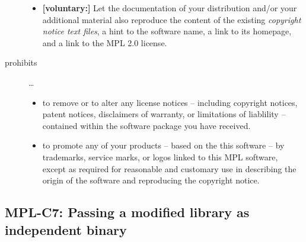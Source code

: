 \begin{description}
\begin{itemize}
  \item \textbf{[voluntary:]} Let the documentation of your distribution and/or
  your additional material  also reproduce the content of the existing
  \emph{copyright notice text files}, a hint to the software name, a link to its
  homepage, and a link to the MPL 2.0 license.

\end{itemize}

\item[prohibits] \ldots
\begin{itemize}
  \item to remove or to alter any license notices -- including copyright
  notices, patent notices, disclaimers of warranty, or limitations of liablility
  -- contained within the software package you have received.
  \item to promote any of your products -- based on the this software -- by
  trademarks, service marks, or logos linked to this MPL software, except as 
  required for reasonable and customary use in describing the origin
  of the software and reproducing the  copyright notice.
\end{itemize}

\end{description}


\subsection{MPL-C7: Passing a modified library as independent binary}
\label{OSUC-08B-MPL}

